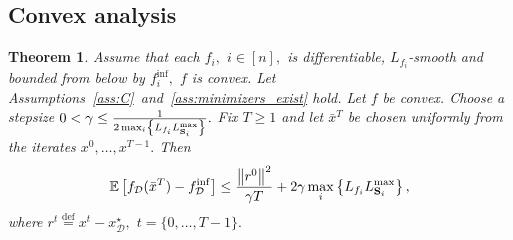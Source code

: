 \documentclass{article}
\newcommand{\bb}{\mathbb}
\newcommand{\norm}[1]{\left\| #1 \right\|}
\newcommand{\cD}{\mathcal{D}}
\newcommand{\eqdef}{\stackrel{\text{def}}{=}}
\newcommand{\Exp}[1]{{\bb E}\left[#1\right]}
\newtheorem{theorem}{Theorem}
\theoremstyle{plain}
\newcommand{\tf}{f_{\mathcal{D}}}
\newcommand{\mS}{{\bf S}}
\theoremstyle{plain}
\theoremstyle{definition}
\theoremstyle{remark}
\begin{document}
\subsection{Convex analysis}
\begin{theorem}
	Assume that each $f_i,$ $i\in[n],$ is differentiable, $L_{f_i}$-smooth and bounded from below by $f_i^{\inf},$ $f$ is convex. Let Assumptions~\ref{ass:C}~and~\ref{ass:minimizers_exist} hold. Let $f$ be convex. Choose a stepsize $0<\gamma\leq\frac{1}{2\max_i\left\lbrace L_{f_i}L_{\mS_i}^{\max} \right\rbrace}.$ Fix $T\geq 1$ and let $\bar{x}^T$ be chosen uniformly from the iterates $x^0,\ldots,x^{T-1}.$ Then
	\begin{equation*}
		\begin{split}
			\Exp{\tf(\bar{x}^T) - \tf^{\inf}}&\leq \frac{\norm{r^0}^2}{\gamma T} + 2\gamma\max_i\left\lbrace L_{f_i}L_{\mS_i}^{\max} \right\rbrace,\\
		\end{split}
	\end{equation*}
	where $r^t\eqdef x^t - x_\cD^\star,$ $t=\{0,\ldots,T-1\}.$
\end{theorem}
\end{document}
